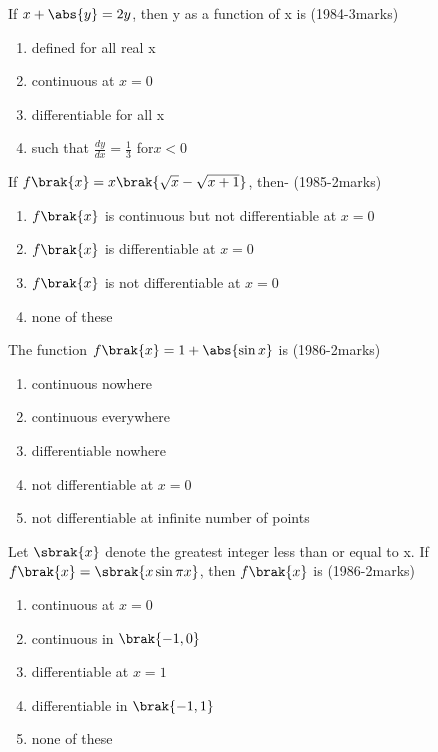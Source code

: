 \iffalse
\title{Assignment-1}
\author{EE24BTECH11048-NITHIN.K}
\section{mcq-multiple}
\fi
	\item If $x+\abs{y}=2y$, then y as a function of x is \hfill{(1984-3marks)}
		\begin{enumerate}
			\item defined for all real x
			\item continuous at $x=0$
			\item differentiable for all x
			\item such that $\frac{dy}{dx}=\frac{1}{3}$ for$x<0$ 
		\end{enumerate}
	\item If $f\brak{x}=x\brak{\sqrt{x}-\sqrt{x+1}}$, then- \hfill{(1985-2marks)}
		\begin{enumerate}
			\item $f\brak{x}$ is continuous but not differentiable at $x=0$
			\item $f\brak{x}$ is differentiable at $x=0$
			\item $f\brak{x}$ is not differentiable at $x=0$
			\item none of these 
		\end{enumerate}
	\item The function $f\brak{x}=1+\abs{\sin{x}}$ is \hfill{(1986-2marks)}
		\begin{enumerate}
			\item continuous nowhere
			\item continuous everywhere
			\item differentiable nowhere 
			\item not differentiable at $x=0$
			\item not differentiable at infinite number of points 
		\end{enumerate}
	\item Let $\sbrak{x}$ denote the greatest integer less than or equal to x. If $f\brak{x}=\sbrak{x\sin{\pi x}}$, then $f\brak{x}$ is \hfill{(1986-2marks)}
		\begin{enumerate}
			\item continuous at $x=0$
			\item continuous in $\brak{-1,0}$
			\item differentiable at $x=1$ 
			\item differentiable in $\brak{-1,1}$ 
			\item none of these 
		\end{enumerate}

